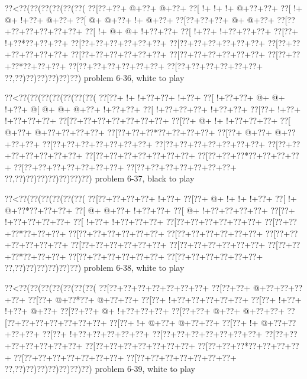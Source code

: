 \vbox{\vbox{\goo
\0??<\0??(\0??(\0??(\0??(\0??(\0??(
\0??[\0??+\0??+\- @+\0??+\- @+\0??+
\0??[\- !+\- !+\- !+\- @+\0??+\0??+
\0??[\- !+\- @+\- !+\0??+\- @+\0??+
\0??[\- @+\- @+\0??+\- !+\- @+\0??+
\0??[\0??+\0??+\0??+\- @+\- @+\0??+
\0??[\0??+\0??+\0??+\0??+\0??+\0??+
\0??[\- !+\- @+\- @+\- !+\0??+\0??+
\0??[\- !+\0??+\- !+\0??+\0??+\0??+
\0??[\0??+\- !+\0??*\0??+\0??+\0??+
\0??[\0??+\0??+\0??+\0??+\0??+\0??+
\0??[\0??+\0??+\0??+\0??+\0??+\0??+
\0??[\0??+\0??+\0??+\0??+\0??+\0??+
\0??[\0??+\0??+\0??+\0??+\0??+\0??+
\0??[\0??+\0??+\0??+\0??+\0??+\0??+
\0??[\0??+\0??+\0??*\0??+\0??+\0??+
\0??[\0??+\0??+\0??+\0??+\0??+\0??+
\0??[\0??+\0??+\0??+\0??+\0??+\0??+
\0??,\0??)\0??)\0??)\0??)\0??)\0??)
}
\hfil problem 6-36, white to play\hfil\break
}

\vbox{\vbox{\goo
\0??<\0??(\0??(\0??(\0??(\0??(\0??(\0??(
\0??[\0??+\- !+\- !+\0??+\0??+\- !+\0??+
\0??[\- !+\0??+\0??+\- @+\- @+\- !+\0??+
\- @[\- @+\- @+\- @+\0??+\- !+\0??+\0??+
\0??[\- !+\0??+\0??+\0??+\- !+\0??+\0??+
\0??[\0??+\- !+\0??+\- !+\0??+\0??+\0??+
\0??[\0??+\0??+\0??+\0??+\0??+\0??+\0??+
\0??[\0??+\- @+\- !+\- !+\0??+\0??+\0??+
\0??[\- @+\0??+\- @+\0??+\0??+\0??+\0??+
\0??[\0??+\0??+\0??*\0??+\0??+\0??+\0??+
\0??[\0??+\- @+\0??+\- @+\0??+\0??+\0??+
\0??[\0??+\0??+\0??+\0??+\0??+\0??+\0??+
\0??[\0??+\0??+\0??+\0??+\0??+\0??+\0??+
\0??[\0??+\0??+\0??+\0??+\0??+\0??+\0??+
\0??[\0??+\0??+\0??+\0??+\0??+\0??+\0??+
\0??[\0??+\0??+\0??*\0??+\0??+\0??+\0??+
\0??[\0??+\0??+\0??+\0??+\0??+\0??+\0??+
\0??[\0??+\0??+\0??+\0??+\0??+\0??+\0??+
\0??,\0??)\0??)\0??)\0??)\0??)\0??)\0??)
}
\hfil problem 6-37, black to play\hfil\break
}

\vbox{\vbox{\goo
\0??<\0??(\0??(\0??(\0??(\0??(\0??(
\0??[\0??+\0??+\0??+\0??+\- !+\0??+
\0??[\0??+\- @+\- !+\- !+\- !+\0??+
\0??[\- !+\- @+\0??*\0??+\0??+\0??+
\0??[\- @+\- @+\0??+\- !+\0??+\0??+
\0??[\- @+\- !+\0??+\0??+\0??+\0??+
\0??[\0??+\- !+\0??+\0??+\0??+\0??+
\0??[\- !+\0??+\- !+\0??+\0??+\0??+
\0??[\0??+\0??+\0??+\0??+\0??+\0??+
\0??[\0??+\0??+\0??*\0??+\0??+\0??+
\0??[\0??+\0??+\0??+\0??+\0??+\0??+
\0??[\0??+\0??+\0??+\0??+\0??+\0??+
\0??[\0??+\0??+\0??+\0??+\0??+\0??+
\0??[\0??+\0??+\0??+\0??+\0??+\0??+
\0??[\0??+\0??+\0??+\0??+\0??+\0??+
\0??[\0??+\0??+\0??*\0??+\0??+\0??+
\0??[\0??+\0??+\0??+\0??+\0??+\0??+
\0??[\0??+\0??+\0??+\0??+\0??+\0??+
\0??,\0??)\0??)\0??)\0??)\0??)\0??)
}
\hfil problem 6-38, white to play\hfil\break
}

\vbox{\vbox{\goo
\0??<\0??(\0??(\0??(\0??(\0??(\0??(\0??(
\0??[\0??+\0??+\0??+\0??+\0??+\0??+\0??+
\0??[\0??+\0??+\- @+\0??+\0??+\0??+\0??+
\0??[\0??+\- @+\0??*\0??+\- @+\0??+\0??+
\0??[\0??+\- !+\0??+\0??+\0??+\0??+\0??+
\0??[\0??+\- !+\0??+\- !+\0??+\- @+\0??+
\0??[\0??+\0??+\- @+\- !+\0??+\0??+\0??+
\0??[\0??+\0??+\- @+\0??+\- @+\0??+\0??+
\0??[\0??+\0??+\0??+\0??+\0??+\0??+\0??+
\0??[\0??+\- !+\- @+\0??+\- @+\0??+\0??+
\0??[\0??+\- !+\- @+\0??+\0??+\0??+\0??+
\0??[\0??+\- !+\0??+\0??+\0??+\0??+\0??+
\0??[\0??+\0??+\0??+\0??+\0??+\0??+\0??+
\0??[\0??+\0??+\0??+\0??+\0??+\0??+\0??+
\0??[\0??+\0??+\0??+\0??+\0??+\0??+\0??+
\0??[\0??+\0??+\0??*\0??+\0??+\0??+\0??+
\0??[\0??+\0??+\0??+\0??+\0??+\0??+\0??+
\0??[\0??+\0??+\0??+\0??+\0??+\0??+\0??+
\0??,\0??)\0??)\0??)\0??)\0??)\0??)\0??)
}
\hfil problem 6-39, white to play\hfil\break
}

